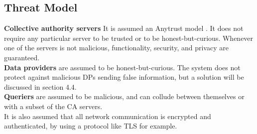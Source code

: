 \documentclass{article}
\begin{document}
\subsection{Threat Model}
\textbf{Collective authority servers} It is assumed an Anytrust model \cite{anytrust}. It does not require any particular server to be trusted or to be honest-but-curious. Whenever one of the servers is not malicious, functionality, security, and privacy are guaranteed.\\
\textbf{Data providers} are assumed to be honest-but-curious. The system does not protect against malicious DPs sending false information, but a solution will be discussed  in section 4.4.\\
\textbf{Queriers} are assumed to be malicious, and can collude between themselves or with a subset of the CA servers.\\
It is also assumed that all network communication is encrypted and authenticated, by using a protocol like TLS for example.
\end{document}
